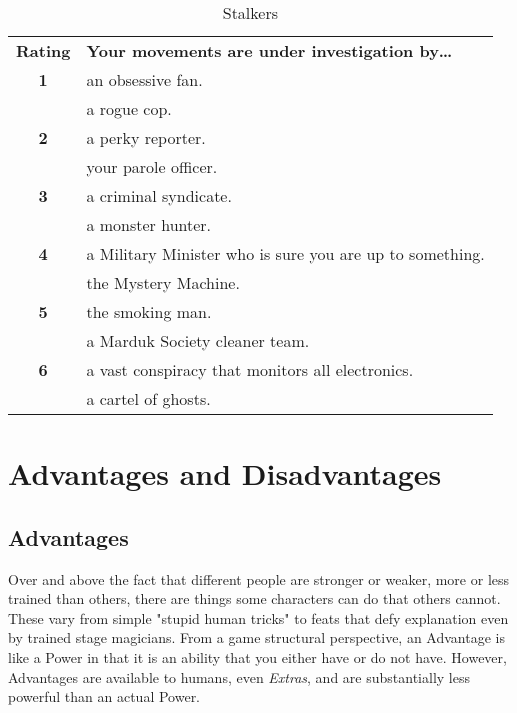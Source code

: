 \begin{table}[htb]
 \caption{Stalkers} \centering
\begin{tabular}{c l}
\textbf{Rating} & \textbf{Your movements are under investigation by\ldots{}}\\
\textbf{1}  &   an obsessive fan.\\
&  a rogue cop.\\
\textbf{2}  &   a perky reporter.\\
& your parole officer.\\
\textbf{3}  &   a criminal syndicate.\\
 &a monster hunter.\\
\textbf{4}  &   a Military Minister who is sure you are up to something.\\
& the Mystery Machine.\\
\textbf{5}  &   the smoking man.\\
& a Marduk Society cleaner team.\\
\textbf{6}  &   a vast conspiracy that monitors all electronics.\\
 &a cartel of ghosts.\\
\end{tabular}
\end{table}

\section{Advantages and Disadvantages}

\subsection{Advantages}

\hspace{\parindent} Over and above the fact that different people are stronger or weaker, more or less trained than others, there are things some characters can do that others cannot. These vary from simple "stupid human tricks" to feats that defy explanation even by trained stage magicians. From a game structural perspective, an Advantage is like a Power in that it is an ability that you either have or do not have. However, Advantages are available to humans, even \textit{Extras}, and are substantially less powerful than an actual Power.

